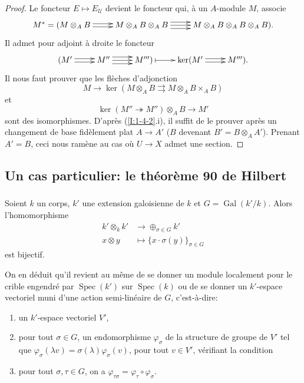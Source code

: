 \documentclass{book}
\DeclareMathOperator{\gal}{Gal}
\DeclareMathOperator{\spec}{Spec}
\newcommand{\sU}{\mathscr{U}}
\begin{document}
\begin{proof}
Le foncteur $E\mapsto E_\sU$ devient le foncteur qui, à un $A$-module $M$, 
associe 
\[\xymatrix{
  M^* = (M\otimes_A B \ar@<2pt>[r] \ar@<-2pt>[r] 
    & M\otimes_A B\otimes_A B \ar@<-4pt>[r] \ar[r] \ar@<4pt>[r] 
    & M\otimes_A B\otimes_A B\otimes_A B)\text{.}
}\]
Il admet pour adjoint à droite le foncteur
\[\xymatrix{
  (M' \ar@<2pt>[r] \ar@<-2pt>[r] 
    & M'' \ar@<-4pt>[r] \ar[r] \ar@<4pt>[r]
    & M''') \ar@{|->}[r] 
    & \ker(M' \ar@<2pt>[r] \ar@<-2pt>[r] 
    & M''')\text{.}
}\]
Il nous faut prouver que les flèches d'adjonction 
\[
  M \to\ker(M\otimes_A B\rightrightarrows M\otimes_A B\times_A B)
\]
et
\[
  \ker(M''\twoheadrightarrow M'')\otimes_A B \to M'
\]
sont des isomorphismes. D'après (\ref{I:1-4-2}.i), il suffit de le prouver 
après un changement de base fidèlement plat $A\to A'$ ($B$ devenant 
$B'=B\otimes_A A'$). Prenant $A'=B$, ceci nous ramène au cas où $U\to X$ 
admet une section. 
\end{proof}










\subsection{Un cas particulier: le théorème 90 de Hilbert}\label{I:1-5}





\subsubsection{}\label{I:1-5-1}

Soient $k$ un corps, $k'$ une extension galoisienne de $k$ et $G=\gal(k'/k)$. 
Alors l'homomorphisme 
\begin{align*}
  k'\otimes_k k' &\to \oplus_{\sigma\in G} k' \\
  x\otimes y     &\mapsto \{x\cdot \sigma(y)\}_{\sigma\in G}
\end{align*}
est bijectif. 

On en déduit qu'il revient au même de se donner un module localement pour 
le crible engendré par $\spec(k')$ sur $\spec(k)$ ou de se donner un 
$k'$-espace vectoriel muni d'une action semi-linéaire de $G$, c'est-à-dire: 
\begin{enumerate}[\indent a)]
  \item un $k'$-espace vectoriel $V'$,
  \item pour tout $\sigma\in G$, un endomorphisme $\varphi_\sigma$ de la 
    structure de groupe de $V'$ tel que 
    $\varphi_\sigma(\lambda v) = \sigma(\lambda) \varphi_\sigma(v)$, pour 
    tout $v\in V'$, vérifiant la condition 
  \item pour tout $\sigma,\tau\in G$, on a 
    $\varphi_{\tau\sigma} = \varphi_\tau\circ\varphi_\sigma$. 
\end{enumerate}
\end{document}
